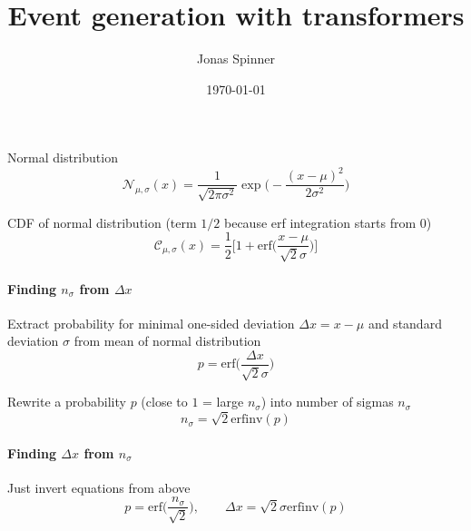 \documentclass[a4paper, 12pt]{article}
\author{Jonas Spinner}
\date{\today}
\title{Event generation with transformers}
\begin{document}
Normal distribution
$$\mathcal{N}_{\mu, \sigma} (x) = \frac{1}{\sqrt{2\pi\sigma^2}} \exp\Big( - \frac{(x-\mu)^2}{2\sigma^2}\Big)$$

CDF of normal distribution (term $1/2$ because erf integration starts from $0$)
$$\mathcal{C}_{\mu, \sigma} (x) = \frac{1}{2}\Big[ 1+ \text{erf}\Big( \frac{x-\mu}{\sqrt{2}\sigma}\Big)\Big]$$

\paragraph{Finding $n_\sigma$ from $\Delta x$}
Extract probability for minimal one-sided deviation $\Delta x  =x-\mu$ and standard deviation $\sigma$ from mean of normal distribution 
$$p = \text{erf}\Big( \frac{\Delta x}{\sqrt{2}\sigma}\Big)$$

Rewrite a probability $p$ (close to $1$ = large $n_\sigma$) into number of sigmas $n_\sigma$
$$n_\sigma = \sqrt{2} \text{erfinv} (p)$$

\paragraph{Finding $\Delta x$ from $n_\sigma$}
Just invert equations from above
$$p = \text{erf}\Big( \frac{n_\sigma}{\sqrt{2}}\Big), \qquad \Delta x = \sqrt{2}\sigma \text{erfinv}(p)$$
\end{document}
